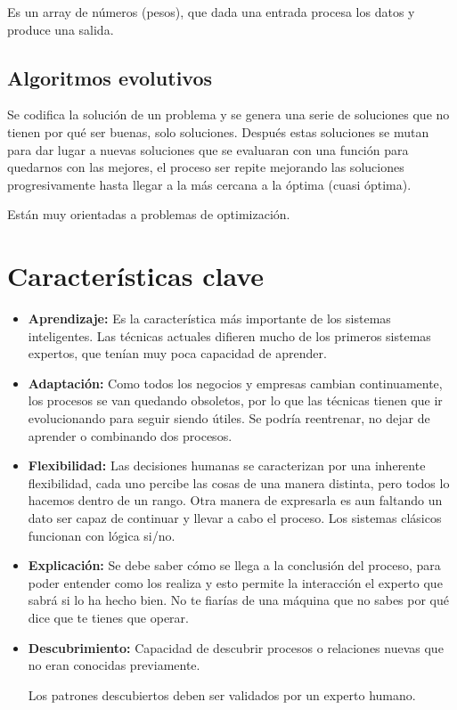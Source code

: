 \documentclass[12pt, twoside, openright]{report} %
\begin{document}
Es un array de números (pesos), que dada una entrada procesa los datos y produce una salida.

\subsection{Algoritmos evolutivos}
Se codifica la solución de un problema y se genera una serie de soluciones que no tienen por qué ser buenas, solo soluciones. Después estas soluciones se mutan para dar lugar a nuevas soluciones que se evaluaran con una función para quedarnos con las mejores, el proceso ser repite mejorando las soluciones progresivamente hasta llegar a la más cercana a la óptima (cuasi óptima).

Están muy orientadas a problemas de optimización.

\section{Características clave}
\begin{itemize}
	\item \textbf{Aprendizaje:} Es la característica más importante de los sistemas inteligentes. Las técnicas actuales difieren mucho de los primeros sistemas expertos, que tenían muy poca capacidad de aprender.
	\item \textbf{Adaptación:} Como todos los negocios y empresas cambian continuamente, los procesos se van quedando obsoletos, por lo que las técnicas tienen que ir evolucionando para seguir siendo útiles. Se podría reentrenar, no dejar de aprender o combinando dos procesos.
	\item \textbf{Flexibilidad:} Las decisiones humanas se caracterizan por una inherente flexibilidad, cada uno percibe las cosas de una manera distinta, pero todos lo hacemos dentro de un rango. Otra manera de expresarla es aun faltando un dato ser capaz de continuar y llevar a cabo el proceso. Los sistemas clásicos funcionan con lógica si/no.
	\item \textbf{Explicación:} Se debe saber cómo se llega a la conclusión del proceso, para poder entender como los realiza y esto permite la interacción el experto que sabrá si lo ha hecho bien. No te fiarías de una máquina que no sabes por qué dice que te tienes que operar.
	\item \textbf{Descubrimiento:} Capacidad de descubrir procesos o relaciones nuevas que no eran conocidas previamente.

	      Los patrones descubiertos deben ser validados por un experto humano.
\end{itemize}
\end{document}
